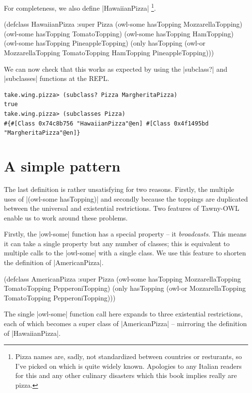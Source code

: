 For completeness, we also define |HawaiianPizza| \footnote{Pizza names are, sadly,
not standardized between countries or resturants, so I've picked on which is
quite widely known. Apologies to any Italian readers for this and any other
culinary disasters which this book implies really are pizza.}.

\begin{tawny}
(defclass HawaiianPizza
  :super
  Pizza
  (owl-some hasTopping MozzarellaTopping)
  (owl-some hasTopping TomatoTopping)
  (owl-some hasTopping HamTopping)
  (owl-some hasTopping PineappleTopping)
  (only hasTopping
        (owl-or MozzarellaTopping TomatoTopping HamTopping PineappleTopping)))
\end{tawny}

We can now check that this works as expected by using the |subclass?| and
|subclasses| functions at the REPL.

\begin{verbatim}
take.wing.pizza> (subclass? Pizza MargheritaPizza)
true
take.wing.pizza> (subclasses Pizza)
#{#[Class 0x74c8b756 "HawaiianPizza"@en] #[Class 0x4f1495bd "MargheritaPizza"@en]}
\end{verbatim}

\section{A simple pattern}
\label{sec:simple-pattern}

The last definition is rather unsatisfying for two reasons. Firstly, the
multiple uses of |(owl-some hasTopping)| and secondly because the toppings are
duplicated between the universal and existential restrictions. Two features of
Tawny-OWL enable us to work around these problems. 

Firstly, the |owl-some| function has a special property -- it
\emph{broadcasts}. This means it can take a single property but any
number of classes; this is equivalent to multiple calls to the
|owl-some| with a single class. We use this feature to shorten the
definition of |AmericanPizza|.

\begin{tawny}
(defclass AmericanPizza
  :super
  Pizza
  (owl-some hasTopping MozzarellaTopping
            TomatoTopping PepperoniTopping)
  (only hasTopping (owl-or MozzarellaTopping TomatoTopping PepperoniTopping)))
\end{tawny}

The single |owl-some| function call here expands to three existential
restrictions, each of which becomes a super class of |AmericanPizza| --
mirroring the definition of |HawaiianPizza|.

